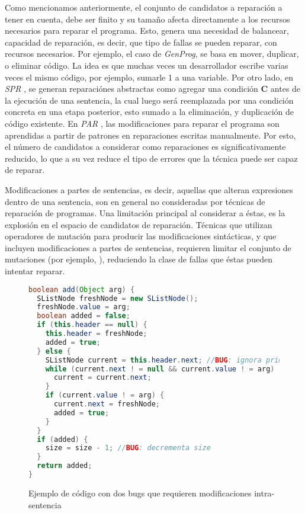 Como mencionamos anteriormente, el conjunto de candidatos a reparaci\'on a tener en cuenta, debe ser finito y su tama\~no afecta directamente a los recursos necesarios para reparar el programa. Esto, genera una necesidad de balancear, capacidad de reparaci\'on, es decir, que tipo de fallas se pueden reparar, con recursos necesarios. Por ejemplo, el caso de \emph{GenProg}, se basa en mover, duplicar, o eliminar c\'odigo. La idea es que muchas veces un desarrollador escribe varias veces el mismo c\'odigo, por ejemplo, sumarle 1 a una variable. Por otro lado, en \emph{SPR} \cite{bibliography.repair.LongR15}, se generan reparaci\'ones abstractas como agregar una condici\'on \textbf{C} antes de la ejecuci\'on de una sentencia, la cual luego ser\'a reemplazada por una condici\'on concreta en una etapa posterior, esto sumado a la eliminaci\'on, y duplicaci\'on de c\'odigo existente. En \emph{PAR} \cite{bibliography.repair.KimNSK13}, las modificaciones para reparar el programa son aprendidas a partir de patrones en reparaciones escritas manualmente. Por esto, el n\'umero de candidatos a considerar como reparaciones es significativamente reducido, lo que a su vez reduce el tipo de errores que la t\'ecnica puede ser capaz de reparar.

Modificaciones a partes de sentencias, es decir, aquellas que alteran expresiones dentro de una sentencia, son en general no consideradas por t\'ecnicas de reparaci\'on de programas. Una limitaci\'on principal al considerar a \'estas, es la explosi\'on en el espacio de candidatos de reparaci\'on. T\'ecnicas que utilizan operadores de mutaci\'on para producir las modificaciones sint\'acticas, y que incluyen modificaciones a partes de sentencias, requieren limitar el conjunto de mutaciones (por ejemplo, \cite{bibliography.repair.GopinathMK11}), reduciendo la clase de fallas que \'estas pueden intentar reparar.

\begin{figure}
\begin{lstlisting}[mathescape=true, language=Java,basicstyle=\footnotesize]
boolean add(Object arg) {
  SListNode freshNode = new SListNode();
  freshNode.value = arg;
  boolean added = false;
  if (this.header == null) {
    this.header = freshNode;
    added = true;
  } else {
    SListNode current = this.header.next; //BUG: ignora primer nodo
    while (current.next ! = null && current.value ! = arg) {
      current = current.next;
    }
    if (current.value ! = arg) {
      current.next = freshNode;
      added = true;
    }
  }
  if (added) {
    size = size - 1; //BUG: decrementa size
  }
  return added;
}
\end{lstlisting}
\caption{Ejemplo de c\'odigo con dos bugs que requieren modificaciones intra-sentencia}
\label{figures.examples.repair.exampleCode}
\end{figure}

